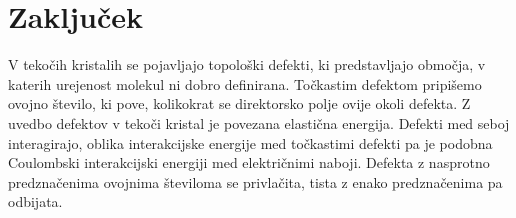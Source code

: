 \documentclass[11pt]{article}
\begin{document}

\section{Zaključek}
V tekočih kristalih se pojavljajo topološki defekti, ki predstavljajo območja, v katerih urejenost molekul ni dobro definirana. Točkastim defektom pripišemo ovojno število, ki pove, kolikokrat se direktorsko polje ovije okoli defekta. Z uvedbo defektov v tekoči kristal je povezana elastična energija. Defekti med seboj interagirajo, oblika interakcijske energije med točkastimi defekti pa je podobna Coulombski interakcijski energiji med električnimi naboji. Defekta z nasprotno predznačenima ovojnima številoma se privlačita, tista z enako predznačenima pa odbijata.







\newpage

\end{document}

